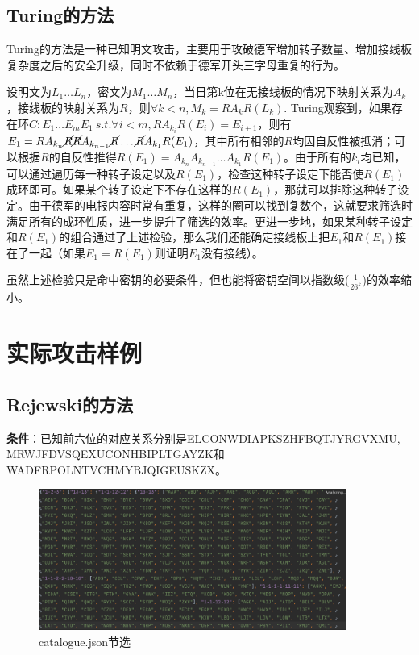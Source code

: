 \documentclass[a4paper,12pt]{article}
\begin{document}
	\subsection{Turing的方法}
	
	Turing的方法是一种已知明文攻击，主要用于攻破德军增加转子数量、增加接线板复杂度之后的安全升级，同时不依赖于德军开头三字母重复的行为。
	
	设明文为$L_1\dots L_n$，密文为$M_1\dots M_n$，当日第k位在无接线板的情况下映射关系为$A_k$，接线板的映射关系为$R$，则$\forall k < n, M_k = RA_kR(L_k)$. Turing观察到，如果存在环$C: E_1\dots E_mE_1\ s.t.\forall i < m, RA_{k_i}R(E_i) = E_{i+1}$，则有$E_1 = RA_{k_n}\cancel{R}\cancel{R}A_{k_{n-1}}\cancel{R}\dots \cancel{R}A_{k_1}R(E_1)$，其中所有相邻的$R$均因自反性被抵消；可以根据$R$的自反性推得$R(E_1) = A_{k_n}A_{k_{n-1}}\dots A_{k_1}R(E_1)$。由于所有的$k_i$均已知，可以通过遍历每一种转子设定以及$R(E_1)$，检查这种转子设定下能否使$R(E_1)$成环即可。如果某个转子设定下不存在这样的$R(E_1)$，那就可以排除这种转子设定。由于德军的电报内容时常有重复，这样的圈可以找到复数个，这就要求筛选时满足所有的成环性质，进一步提升了筛选的效率。更进一步地，如果某种转子设定和$R(E_1)$的组合通过了上述检验，那么我们还能确定接线板上把$E_1$和$R(E_1)$接在了一起（如果$E_1 = R(E_1)$则证明$E_1$没有接线）。
	
	虽然上述检验只是命中密钥的必要条件，但也能将密钥空间以指数级($\frac{1}{26^k}$)的效率缩小。
	
	\section{实际攻击样例}
	
	\subsection{Rejewski的方法}
	\noindent\textbf{条件}：已知前六位的对应关系分别是ELCONWDIAPKSZHFBQTJYRGVXMU, MRWJFDVSQEXUCONHBIPLTGAYZK和WADFRPOLNTVCHMYBJQIGEUSKZX。
	
	\begin{figure}[h]
		\centering
		\includegraphics[width=0.9\textwidth]{rejcatalogue}
		\caption{catalogue.json节选}
	\end{figure}
\end{document}
